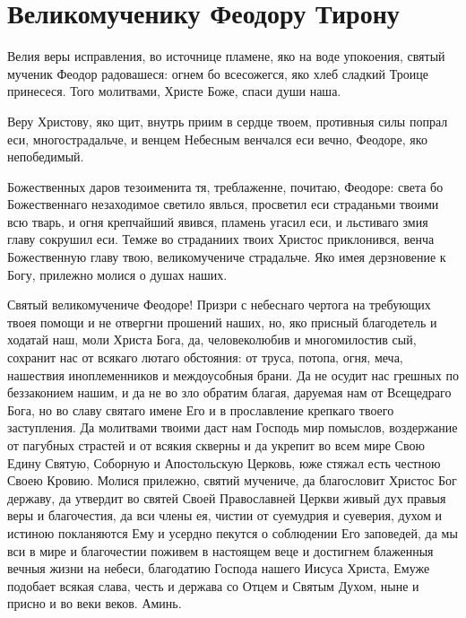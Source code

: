 \vspace{-\baselineskip}\section{Великомученику Феодору Тирону}\begin{mymulticols}


Велия веры исправления, во источнице пламене, яко на воде упокоения, святый мученик Феодор радовашеся: огнем бо всесожегся, яко хлеб сладкий Троице принесеся. Того молитвами, Христе Боже, спаси души наша.


Веру Христову, яко щит, внутрь приим в сердце твоем, противныя силы попрал еси, многострадальче, и венцем Небесным венчался еси вечно, Феодоре, яко непобедимый.


Божественных даров тезоименита тя, треблаженне, почитаю, Феодоре: света бо Божественнаго незаходимое светило явлься, просветил еси страданьми твоими всю тварь, и огня крепчайший явився, пламень угасил еси, и льстиваго змия главу сокрушил еси. Темже во страданиих твоих Христос приклонився, венча Божественную главу твою, великомучениче страдальче. Яко имея дерзновение к Богу, прилежно молися о душах наших.


Святый великомучениче Феодоре! Призри с небеснаго чертога на требующих твоея помощи и не отвергни прошений наших, но, яко присный благодетель и ходатай наш, моли Христа Бога, да, человеколюбив и многомилостив сый, сохранит нас от всякаго лютаго обстояния: от труса, потопа, огня, меча, нашествия иноплеменников и междоусобныя брани. Да не осудит нас грешных по беззаконием нашим, и да не во зло обратим благая, даруемая нам от Всещедраго Бога, но во славу святаго имене Его и в прославление крепкаго твоего заступления. Да молитвами твоими даст нам Господь мир помыслов, воздержание от пагубных страстей и от всякия скверны и да укрепит во всем мире Свою Едину Святую, Соборную и Апостольскую Церковь, юже стяжал есть честною Своею Кровию. Молися прилежно, святий мучениче, да благословит Христос Бог державу, да утвердит во святей Своей Православней Церкви живый дух правыя веры и благочестия, да вси члены ея, чистии от суемудрия и суеверия, духом и истиною покланяются Ему и усердно пекутся о соблюдении Его заповедей, да мы вси в мире и благочестии поживем в настоящем веце и достигнем блаженныя вечныя жизни на небеси, благодатию Господа нашего Иисуса Христа, Емуже подобает всякая слава, честь и держава со Отцем и Святым Духом, ныне и присно и во веки веков. Аминь.

\mychapterending[2][0.3]

\end{mymulticols}


